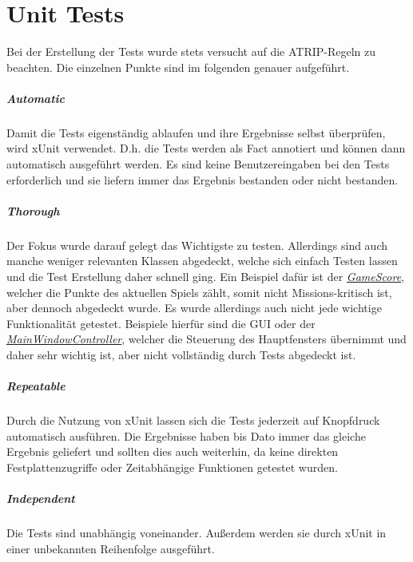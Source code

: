 \chapter{Unit Tests}

Bei der Erstellung der Tests wurde stets versucht auf die ATRIP-Regeln zu beachten. Die einzelnen Punkte sind im folgenden genauer aufgeführt.

\paragraph{Automatic}
Damit die Tests eigenständig ablaufen und ihre Ergebnisse selbst überprüfen, wird xUnit verwendet. D.h. die Tests werden als \glqq Fact\grqq{} annotiert und können dann automatisch ausgeführt werden. Es sind keine Benutzereingaben bei den Tests erforderlich und sie liefern immer das Ergebnis \glqq bestanden\grqq{} oder \glqq nicht bestanden\grqq{}.

\paragraph{Thorough}
Der Fokus wurde darauf gelegt das Wichtigste zu testen. Allerdings sind auch manche weniger relevanten Klassen abgedeckt, welche sich einfach Testen lassen und die Test Erstellung daher schnell ging. Ein Beispiel dafür ist der \href{https://github.com/EinToni/Wortfinder/blob/main/Wortfinder/GameScore.cs}{\textit{GameScore}}, welcher die Punkte des aktuellen Spiels zählt, somit nicht Missions-kritisch ist, aber dennoch abgedeckt wurde. Es wurde allerdings auch nicht jede wichtige Funktionalität getestet. Beispiele hierfür sind die GUI oder der \href{https://github.com/EinToni/Wortfinder/blob/main/Wortfinder/MainWindowController.cs}{\textit{MainWindowController}}, welcher die Steuerung des Hauptfensters übernimmt und daher sehr wichtig ist, aber nicht vollständig durch Tests abgedeckt ist.

\paragraph{Repeatable}
Durch die Nutzung von xUnit lassen sich die Tests jederzeit auf Knopfdruck automatisch ausführen. Die Ergebnisse haben bis Dato immer das gleiche Ergebnis geliefert und sollten dies auch weiterhin, da keine direkten Festplattenzugriffe oder Zeitabhängige Funktionen getestet wurden. 

\paragraph{Independent}
Die Tests sind unabhängig voneinander. Außerdem werden sie durch xUnit in einer unbekannten Reihenfolge ausgeführt.

